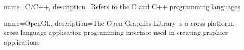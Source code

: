 {
	name=C/C++, 
	description={Refers to the C and C++ programming languages}
}

{
	name=OpenGL, 
	description={The Open Graphics Library is a cross-platform, cross-language application programming interface used in creating graphics applications}
}

